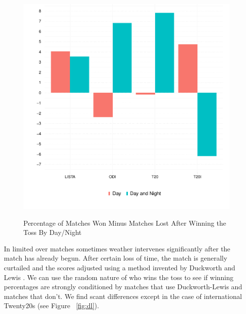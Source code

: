 \documentclass[12pt]{article}
\begin{document}
\begin{figure}[htbp]
\centering
\caption{Percentage of Matches Won Minus Matches Lost After Winning the Toss By Day/Night}
\includegraphics[scale=.85]{../figs/winbyDayNight.pdf}
\label{fig:dn}
\end{figure}

In limited over matches sometimes weather intervenes significantly after the match has already begun. After certain loss of time, the match is generally curtailed and the scores adjusted using a method invented by Duckworth and Lewis \citep[see][]{duckworth1998}. We can use the random nature of who wins the toss to see if winning percentages are strongly conditioned by matches that use Duckworth-Lewis and matches that don't. We find scant differences except in the case of international Twenty20s (see Figure ~\ref{fig:dl}).
\end{document}
